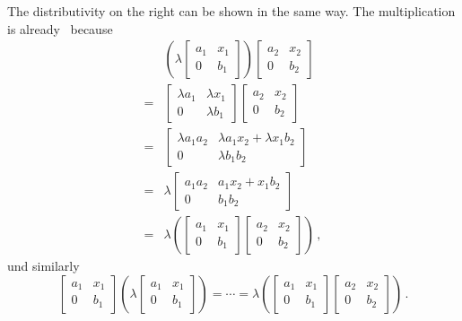 The distributivity on the right can be shown in the same way.
The multiplication is already~{\kbil} because
\begin{align*}
  {}&
  \left(
    \lambda
    \begin{bmatrix}
      a_1 & x_1 \\
      0   & b_1
    \end{bmatrix}
  \right)
  \begin{bmatrix}
    a_2 & x_2 \\
    0   & b_2
  \end{bmatrix}
  \\
  ={}&
  \begin{bmatrix}
    \lambda a_1 & \lambda x_1 \\
    0           & \lambda b_1
  \end{bmatrix}
  \begin{bmatrix}
    a_2 & x_2 \\
    0   & b_2
  \end{bmatrix}
  \\
  ={}&
  \begin{bmatrix}
    \lambda a_1 a_2 & \lambda a_1 x_2 + \lambda x_1 b_2 \\
    0               & \lambda b_1 b_2
  \end{bmatrix}
  \\
  ={}&
  \lambda
  \begin{bmatrix}
    a_1 a_2 & a_1 x_2 + x_1 b_2 \\
    0       & b_1 b_2
  \end{bmatrix}
  \\
  ={}&
  \lambda
  \left(
    \begin{bmatrix}
      a_1 & x_1 \\
      0   & b_1
    \end{bmatrix}
    \begin{bmatrix}
      a_2 & x_2 \\
      0   & b_2
    \end{bmatrix}
  \right) \,,
\end{align*}
und similarly
\[
  \begin{bmatrix}
    a_1 & x_1 \\
    0   & b_1
  \end{bmatrix}
  \left(
    \lambda
    \begin{bmatrix}
      a_1 & x_1 \\
      0   & b_1
    \end{bmatrix}
  \right)
  =
  \dotsb
  =
  \lambda
  \left(
    \begin{bmatrix}
      a_1 & x_1 \\
      0   & b_1
    \end{bmatrix}
    \begin{bmatrix}
      a_2 & x_2 \\
      0   & b_2
    \end{bmatrix}
  \right) \,.
\]
